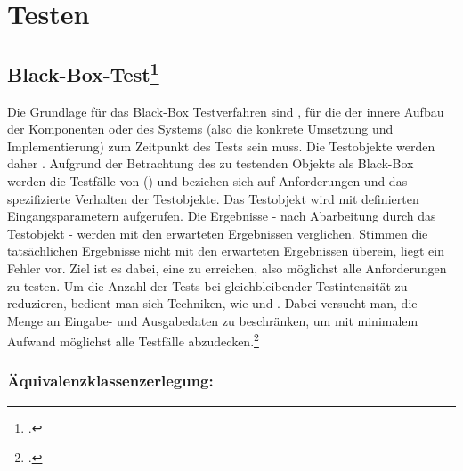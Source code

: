 \documentclass{lehramt-informatik}
\begin{document}

\chapter{Testen}

\begin{quellen}
\item \cite[Kapitel 4 „Software-Text“; Seite 157-246]{hoffmann}
\end{quellen}

%

\section{Black-Box-Test\footcite[Seite 32]{sosy:fs:5}}

Die Grundlage für das Black-Box Testverfahren sind , für die der innere Aufbau der Komponenten oder des
Systems (also die konkrete Umsetzung und Implementierung) zum Zeitpunkt
des Tests  sein muss. Die Testobjekte werden daher
. Aufgrund der
Betrachtung des zu testenden Objekts als Black-Box werden die Testfälle
von  () und beziehen sich auf
Anforderungen und das spezifizierte Verhalten der Testobjekte. Das
Testobjekt wird mit definierten Eingangsparametern aufgerufen. Die
Ergebnisse - nach Abarbeitung durch das Testobjekt - werden mit den
erwarteten Ergebnissen verglichen. Stimmen die tatsächlichen Ergebnisse
nicht mit den erwarteten Ergebnissen überein, liegt ein Fehler vor. Ziel
ist es dabei, eine  zu
erreichen, also möglichst alle Anforderungen zu testen. Um die Anzahl
der Tests bei gleichbleibender Testintensität zu reduzieren, bedient man
sich Techniken, wie  und
. Dabei versucht man, die Menge an Eingabe- und
Ausgabedaten zu beschränken, um mit minimalem Aufwand möglichst alle
Testfälle abzudecken.\footcite[Seite 140-141]{schatten}

%

\subsection{Äquivalenzklassenzerlegung:}
\end{document}
